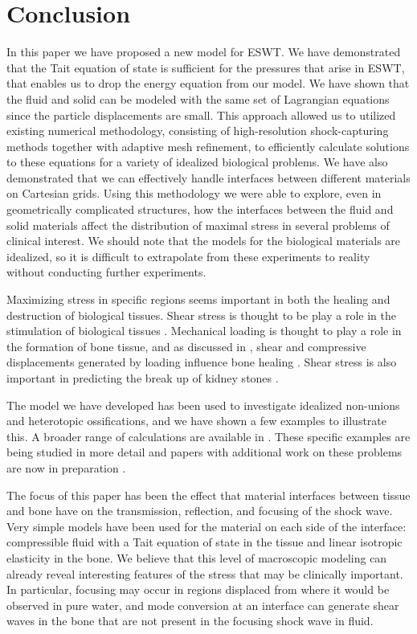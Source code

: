 \documentclass{article}
\begin{document}
\section{Conclusion}
In this paper we have proposed a new model for ESWT.  We have demonstrated that the Tait 
equation of state is sufficient for the pressures that arise in ESWT, that enables us to drop the energy equation from our model.  We have shown that the fluid and 
solid can be modeled with the same set of Lagrangian equations since the particle displacements are 
small.  This approach allowed us to utilized existing numerical methodology, consisting of 
high-resolution shock-capturing methods together with adaptive mesh refinement, to efficiently 
calculate solutions to these equations for a variety of idealized biological problems.  We have 
also demonstrated that we can effectively handle interfaces between different materials on Cartesian 
grids.  Using this methodology we were able to explore, even in geometrically complicated structures, 
how the interfaces between the fluid and solid materials  affect the distribution of maximal 
stress in several problems of clinical interest.  We should note that the models for the biological materials are idealized, so it is difficult to extrapolate from these experiments to reality without conducting further experiments. 

Maximizing stress in specific regions seems important in both the
healing and destruction of biological tissues.  Shear stress is
thought to be play a role in the stimulation of biological
tissues \cite{eswt_vegf,frangos,freund,goodship1985,claes1999,lacroix2002,park1998}.  
Mechanical loading is thought 
to play a role in the formation of bone tissue, and as discussed in , 
shear and compressive displacements generated by loading influence bone healing 
\cite{park1998,prendergast1997,lacroix2002,claes1999,isaksson2006,carter1998,goodship1985}.  
Shear stress is also important in predicting the break up of kidney stones \cite{bailey_oleg}.

The model we have developed has been used to investigate idealized non-unions and 
heterotopic ossifications, and we have shown a few examples to illustrate this.  
A broader range of calculations are available in \cite{fagnan:phd}.  These specific examples are
 being studied in more detail and papers with additional work on these problems are now in 
 preparation \cite{kfagnan_mchang_ho, amath_apl_nonunion}.
  
The focus of this paper has been the effect that material interfaces between
tissue and bone have on the transmission, reflection, and 
focusing of the shock wave.  Very simple models have been used for the
material on each side of the interface: compressible fluid with a Tait
equation of state in the tissue and linear isotropic elasticity in the bone.
We believe that this level of macroscopic modeling can already reveal
interesting features of the stress that may be clinically important.  In
particular, focusing may occur in regions displaced from where it would be
observed in pure water, and mode conversion at an interface can generate
shear waves in the bone that are not present in the focusing shock
wave in fluid.
\end{document}
